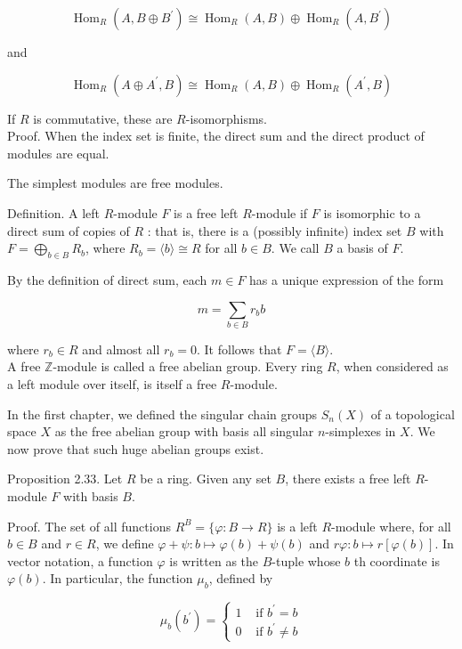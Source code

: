 \documentclass[10pt]{article}
\begin{document}
$$
\operatorname{Hom}_{R}\left(A, B \oplus B^{\prime}\right) \cong \operatorname{Hom}_{R}(A, B) \oplus \operatorname{Hom}_{R}\left(A, B^{\prime}\right)
$$

and

$$
\operatorname{Hom}_{R}\left(A \oplus A^{\prime}, B\right) \cong \operatorname{Hom}_{R}(A, B) \oplus \operatorname{Hom}_{R}\left(A^{\prime}, B\right)
$$

If $R$ is commutative, these are $R$-isomorphisms.\\
Proof. When the index set is finite, the direct sum and the direct product of modules are equal.

The simplest modules are free modules.

Definition. A left $R$-module $F$ is a free left $R$-module if $F$ is isomorphic to a direct sum of copies of $R$ : that is, there is a (possibly infinite) index set $B$ with $F=\bigoplus_{b \in B} R_{b}$, where $R_{b}=\langle b\rangle \cong R$ for all $b \in B$. We call $B$ a basis of $F$.

By the definition of direct sum, each $m \in F$ has a unique expression of the form

$$
m=\sum_{b \in B} r_{b} b
$$

where $r_{b} \in R$ and almost all $r_{b}=0$. It follows that $F=\langle B\rangle$.\\
A free $\mathbb{Z}$-module is called a free abelian group. Every ring $R$, when considered as a left module over itself, is itself a free $R$-module.

In the first chapter, we defined the singular chain groups $S_{n}(X)$ of a topological space $X$ as the free abelian group with basis all singular $n$-simplexes in $X$. We now prove that such huge abelian groups exist.

Proposition 2.33. Let $R$ be a ring. Given any set $B$, there exists a free left $R$-module $F$ with basis $B$.

Proof. The set of all functions $R^{B}=\{\varphi: B \rightarrow R\}$ is a left $R$-module where, for all $b \in B$ and $r \in R$, we define $\varphi+\psi: b \mapsto \varphi(b)+\psi(b)$ and $r \varphi: b \mapsto r[\varphi(b)]$. In vector notation, a function $\varphi$ is written as the $B$-tuple whose $b$ th coordinate is $\varphi(b)$. In particular, the function $\mu_{b}$, defined by

$$
\mu_{b}\left(b^{\prime}\right)= \begin{cases}1 & \text { if } b^{\prime}=b \\ 0 & \text { if } b^{\prime} \neq b\end{cases}
$$
\end{document}
